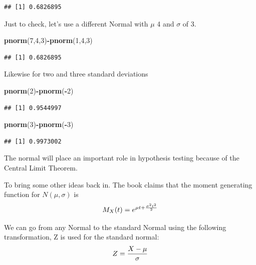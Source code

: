 \documentclass[]{book}
\newenvironment{Shaded}{\begin{snugshade}}{\end{snugshade}}
\newcommand{\KeywordTok}[1]{\textcolor[rgb]{0.13,0.29,0.53}{\textbf{#1}}}
\newcommand{\DecValTok}[1]{\textcolor[rgb]{0.00,0.00,0.81}{#1}}
\newcommand{\OperatorTok}[1]{\textcolor[rgb]{0.81,0.36,0.00}{\textbf{#1}}}
\newcommand{\NormalTok}[1]{#1}
\theoremstyle{definition}
\theoremstyle{definition}
\theoremstyle{definition}
\theoremstyle{remark}
\begin{document}
\begin{verbatim}
## [1] 0.6826895
\end{verbatim}

Just to check, let's use a different Normal with \(\mu\) 4 and
\(\sigma\) of 3.

\begin{Shaded}
\begin{Highlighting}[]
\KeywordTok{pnorm}\NormalTok{(}\DecValTok{7}\NormalTok{,}\DecValTok{4}\NormalTok{,}\DecValTok{3}\NormalTok{)}\OperatorTok{-}\KeywordTok{pnorm}\NormalTok{(}\DecValTok{1}\NormalTok{,}\DecValTok{4}\NormalTok{,}\DecValTok{3}\NormalTok{)}
\end{Highlighting}
\end{Shaded}

\begin{verbatim}
## [1] 0.6826895
\end{verbatim}

Likewise for two and three standard deviations

\begin{Shaded}
\begin{Highlighting}[]
\KeywordTok{pnorm}\NormalTok{(}\DecValTok{2}\NormalTok{)}\OperatorTok{-}\KeywordTok{pnorm}\NormalTok{(}\OperatorTok{-}\DecValTok{2}\NormalTok{)}
\end{Highlighting}
\end{Shaded}

\begin{verbatim}
## [1] 0.9544997
\end{verbatim}

\begin{Shaded}
\begin{Highlighting}[]
\KeywordTok{pnorm}\NormalTok{(}\DecValTok{3}\NormalTok{)}\OperatorTok{-}\KeywordTok{pnorm}\NormalTok{(}\OperatorTok{-}\DecValTok{3}\NormalTok{)}
\end{Highlighting}
\end{Shaded}

\begin{verbatim}
## [1] 0.9973002
\end{verbatim}

The normal will place an important role in hypothesis testing because of
the Central Limit Theorem.

To bring some other ideas back in. The book claims that the moment
generating function for \(N(\mu,\sigma)\) is
\[M_{X}(t)=e^{\mu t + {\sigma ^2 t^2 \over 2}}\]

We can go from any Normal to the standard Normal using the following
transformation, Z is used for the standard normal:
\[Z={X - \mu \over \sigma}\]
\end{document}
